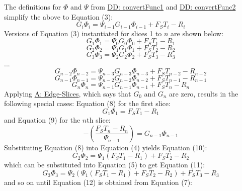 \documentclass[12pt]{article}
\begin{document}
The definitions for $Φ$ and $Ψ$ from \hyperref[DD:convertFunc1]{DD: convertFunc1} and \hyperref[DD:convertFunc2]{DD: convertFunc2} simplify the above to Equation (3):
\begin{displaymath}
G_{i} Φ_{i}=Ψ_{i-1} G_{i-1} Φ_{i-1}+{F_{S}} T_{i}-R_{i}
\end{displaymath}
Versions of Equation (3) instantiated for slices 1 to $n$ are shown below:
\begin{displaymath}
G_{1} Φ_{1}=Ψ_{0} G_{0} Φ_{0}+{F_{S}} T_{1}-R_{1}
\end{displaymath}
\begin{displaymath}
G_{2} Φ_{2}=Ψ_{1} G_{1} Φ_{1}+{F_{S}} T_{2}-R_{2}
\end{displaymath}
\begin{displaymath}
G_{3} Φ_{3}=Ψ_{2} G_{2} Φ_{2}+{F_{S}} T_{3}-R_{3}
\end{displaymath}
...
\begin{displaymath}
G_{n-2} Φ_{n-2}=Ψ_{n-3} G_{n-3} Φ_{n-3}+{F_{S}} T_{n-2}-R_{n-2}
\end{displaymath}
\begin{displaymath}
G_{n-1} Φ_{n-1}=Ψ_{n-2} G_{n-2} Φ_{n-2}+{F_{S}} T_{n-1}-R_{n-1}
\end{displaymath}
\begin{displaymath}
G_{n} Φ_{n}=Ψ_{n-1} G_{n-1} Φ_{n-1}+{F_{S}} T_{n}-R_{n}
\end{displaymath}
Applying \hyperref[assumpES]{A: Edge-Slices}, which says that $G_{0}$ and $G_{n}$ are zero, results in the following special cases: Equation (8) for the first slice:
\begin{displaymath}
G_{1} Φ_{1}={F_{S}} T_{1}-R_{1}
\end{displaymath}
and Equation (9) for the $n$th slice:
\begin{displaymath}
-\left(\frac{{F_{S}} T_{n}-R_{n}}{Ψ_{n-1}}\right)=G_{n-1} Φ_{n-1}
\end{displaymath}
Substituting Equation (8) into Equation (4) yields Equation (10):
\begin{displaymath}
G_{2} Φ_{2}=Ψ_{1} \left({F_{S}} T_{1}-R_{1}\right)+{F_{S}} T_{2}-R_{2}
\end{displaymath}
which can be substituted into Equation (5) to get Equation (11):
\begin{displaymath}
G_{3} Φ_{3}=Ψ_{2} \left(Ψ_{1} \left({F_{S}} T_{1}-R_{1}\right)+{F_{S}} T_{2}-R_{2}\right)+{F_{S}} T_{3}-R_{3}
\end{displaymath}
and so on until Equation (12) is obtained from Equation (7):
\end{document}
